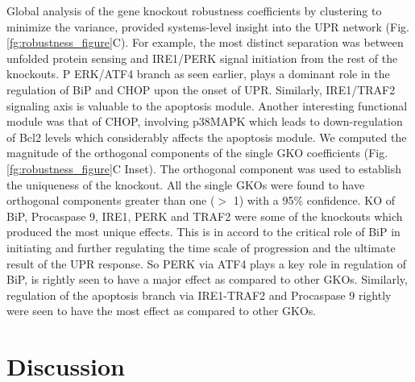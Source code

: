 \documentclass[fleqn,10pt]{wlscirep}
\begin{document}
Global analysis of the gene knockout robustness coefficients by clustering to minimize the variance, provided systems-level insight into the UPR network (Fig. \ref{fg:robustness_figure}C).
For example, the most distinct separation was between unfolded protein sensing and IRE1/PERK signal initiation from the rest of the knockouts. P
ERK/ATF4 branch as seen earlier, plays a dominant role in the regulation of BiP and CHOP upon the onset of UPR.
Similarly, IRE1/TRAF2 signaling axis is valuable to the apoptosis module.
Another interesting functional module was that of CHOP, involving p38MAPK which leads to down-regulation of Bcl2 levels which considerably affects the apoptosis module.
We computed the magnitude of the orthogonal components of the single GKO coefficients (Fig. \ref{fg:robustness_figure}C Inset). The orthogonal component was used to establish the uniqueness of the knockout.
All the single GKOs were found to have orthogonal components greater than one ($>$ 1) with a 95\% confidence. KO of BiP, Procaspase 9, IRE1, PERK and TRAF2 were some of the knockouts which produced the most unique effects.
This is in accord to the critical role of BiP in initiating and further regulating the time scale of progression and the ultimate result of the UPR response.
So PERK via ATF4 plays a key role in regulation of BiP, is rightly seen to have a major effect as compared to other GKOs.
Similarly, regulation of the apoptosis branch via IRE1-TRAF2 and Procaspase 9 rightly were seen to have the most effect as compared to other GKOs.



\section*{Discussion}
\end{document}
